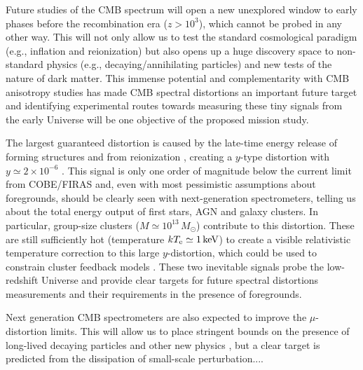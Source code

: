 Future studies of the CMB spectrum will open a new unexplored window to early phases before the recombination era ($z > 10^3$), which cannot be probed in any other way. This will not only allow us to test the standard cosmological paradigm (e.g., inflation and reionization) but also opens up a huge discovery space to non-standard physics (e.g., decaying/annihilating particles) and new tests of the nature of dark matter. This immense potential and complementarity with CMB anisotropy studies has made CMB spectral distortions an important future target and identifying experimental routes towards measuring these tiny signals from the early Universe will be one objective of the proposed mission study.

The largest guaranteed distortion is caused by the late-time energy release of forming structures and from reionization \citep{Sunyaev1972b, Hu1994pert, Oh2003, Cen1999, Refregier2000}, creating a $y$-type distortion with $y \simeq 2\times 10^{-6}$ \citep[e.g.,][]{Refregier2000, Hill2015}. This signal is only one order of magnitude below the current limit from COBE/FIRAS and, even with most pessimistic assumptions about foregrounds, should be clearly seen with next-generation spectrometers, telling us about the total energy output of first stars, AGN and galaxy clusters. In particular, group-size clusters ($M\simeq 10^{13}\,M_{\odot}$) contribute to this distortion. These are still sufficiently hot (temperature $k T_{\rm e}\simeq 1\,{\rm keV}$) to create a visible relativistic temperature correction to this large $y$-distortion, which could be used to constrain cluster feedback models \citep{Hill2015}. These two inevitable signals probe the low-redshift Universe and provide clear targets for future spectral distortions measurements and their requirements in the presence of foregrounds.

Next generation CMB spectrometers are also expected to improve the  $\mu$-distortion limits. This will allow us to place stringent bounds on the presence of long-lived decaying particles \citep{Hu1993b, Chluba2013fore, Chluba2013PCA, Dimastrogiovanni2015} and other new physics \citep[e.g.,][]{Jedamzik2000, Tashiro2012, Dolgov2013, Tashiro2013, Caldwell2013}, but a clear target is predicted from the dissipation of small-scale perturbation....


